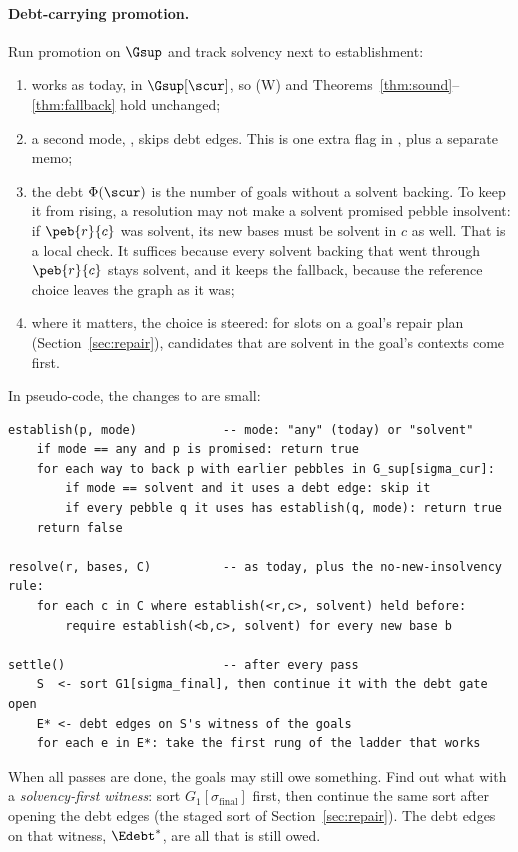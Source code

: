 \paragraph{Debt-carrying promotion.} Run promotion on $\Gsup$ and track solvency next to establishment:
\begin{enumerate}[nosep]
\item {} works as today, in $\Gsup[\scur]$, so (W) and Theorems~\ref{thm:sound}--\ref{thm:fallback} hold unchanged;
\item a second mode, , skips debt edges. This is one extra flag in , plus a separate memo;
\item the debt $\Phi(\scur)$ is the number of goals without a solvent backing. To keep it from rising, a resolution may not make a solvent promised pebble insolvent: if $\peb{r}{c}$ was solvent, its new bases must be solvent in $c$ as well. That is a local check. It suffices because every solvent backing that went through $\peb{r}{c}$ stays solvent, and it keeps the fallback, because the reference choice leaves the graph as it was;
\item where it matters, the choice is steered: for slots on a goal's repair plan (Section~\ref{sec:repair}), candidates that are solvent in the goal's contexts come first.
\end{enumerate}
In pseudo-code, the changes to  are small:
\par\smallskip\noindent\begin{minipage}{\linewidth}
\begin{Verbatim}[fontsize=\small, frame=single, framesep=3mm]
establish(p, mode)            -- mode: "any" (today) or "solvent"
    if mode == any and p is promised: return true
    for each way to back p with earlier pebbles in G_sup[sigma_cur]:
        if mode == solvent and it uses a debt edge: skip it
        if every pebble q it uses has establish(q, mode): return true
    return false

resolve(r, bases, C)          -- as today, plus the no-new-insolvency rule:
    for each c in C where establish(<r,c>, solvent) held before:
        require establish(<b,c>, solvent) for every new base b

settle()                      -- after every pass
    S  <- sort G1[sigma_final], then continue it with the debt gate open
    E* <- debt edges on S's witness of the goals
    for each e in E*: take the first rung of the ladder that works
\end{Verbatim}
\end{minipage}\par\smallskip
When all passes are done, the goals may still owe something. Find out what with a \emph{solvency-first witness}: sort $G_1[\sigma_{\mathrm{final}}]$ first, then continue the same sort after opening the debt edges (the staged sort of Section~\ref{sec:repair}). The debt edges on that witness, $\Edebt^{*}$, are all that is still owed.

